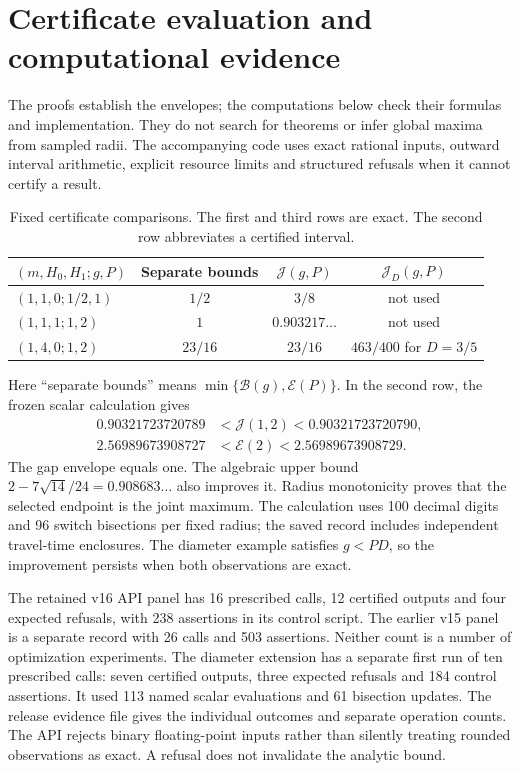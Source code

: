 \section{Certificate evaluation and computational evidence}
\label{compact:evidence}
The proofs establish the envelopes; the computations below check
their formulas and implementation. They do not search for theorems
or infer global maxima from sampled radii. The accompanying code
uses exact rational inputs, outward interval arithmetic, explicit
resource limits and structured refusals when it cannot certify a result.

\begin{table}[htbp]
\centering
\caption{Fixed certificate comparisons. The first and third rows are
exact. The second row abbreviates a certified interval.}
\label{compact:certificate-table}
\begin{tabular}{lccc}
\toprule
$(m,H_0,H_1;g,P)$ & Separate bounds & $\mathcal J(g,P)$ & $\mathcal J_D(g,P)$\\
\midrule
$(1,1,0;1/2,1)$ & $1/2$ & $3/8$ & not used\\
$(1,1,1;1,2)$ & $1$ & $0.903217\ldots$ & not used\\
$(1,4,0;1,2)$ & $23/16$ & $23/16$ & $463/400$ for $D=3/5$\\
\bottomrule
\end{tabular}
\end{table}
Here ``separate bounds'' means
$\min\{\mathcal B(g),\mathcal E(P)\}$.
In the second row, the frozen scalar calculation gives
\[
 \begin{aligned}
 0.90321723720789&<\mathcal J(1,2)<0.90321723720790,\\
 2.56989673908727&<\mathcal E(2)<2.56989673908729.
 \end{aligned}
\]
The gap envelope equals one. The algebraic upper bound
$2-7\sqrt{14}/24=0.908683\ldots$ also improves it.
Radius monotonicity proves that the selected endpoint is the joint
maximum. The calculation uses 100 decimal digits and 96 switch
bisections per fixed radius; the saved record includes independent
travel-time enclosures. The diameter example satisfies $g<PD$, so
the improvement persists when both observations are exact.

The retained v16 API panel has 16 prescribed calls, 12 certified
outputs and four expected refusals, with 238 assertions in its control
script. The earlier v15 panel is a separate record with 26 calls and
503 assertions. Neither count is a number of optimization experiments.
The diameter extension has a separate first run of ten prescribed
calls: seven certified outputs, three expected refusals and 184 control
assertions. It used 113 named scalar evaluations and 61 bisection
updates. The release evidence file gives the individual outcomes and
separate operation counts. The API rejects
binary floating-point inputs rather than silently treating rounded
observations as exact. A refusal does not invalidate the analytic bound.

